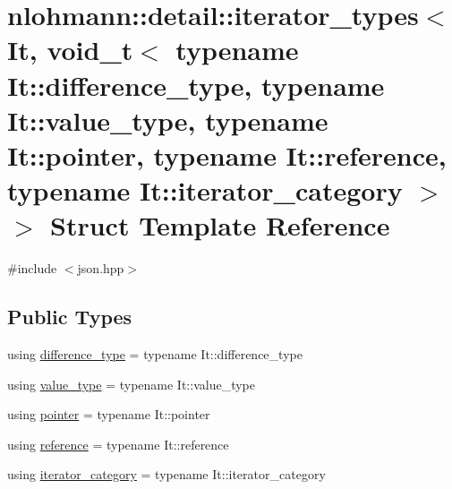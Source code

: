 \hypertarget{structnlohmann_1_1detail_1_1iterator__types_3_01_it_00_01void__t_3_01typename_01_it_1_1differenc4a413e9bd546446175f10f15c5631361}{}\section{nlohmann\+::detail\+::iterator\+\_\+types$<$ It, void\+\_\+t$<$ typename It\+::difference\+\_\+type, typename It\+::value\+\_\+type, typename It\+::pointer, typename It\+::reference, typename It\+::iterator\+\_\+category $>$ $>$ Struct Template Reference}
\label{structnlohmann_1_1detail_1_1iterator__types_3_01_it_00_01void__t_3_01typename_01_it_1_1differenc4a413e9bd546446175f10f15c5631361}


{\ttfamily \#include $<$json.\+hpp$>$}

\subsection*{Public Types}
\begin{DoxyCompactItemize}
\item 
using \mbox{\hyperlink{structnlohmann_1_1detail_1_1iterator__types_3_01_it_00_01void__t_3_01typename_01_it_1_1differenc4a413e9bd546446175f10f15c5631361_a1ce16c1c8c1d6a195f5a3d3ad31820f0}{difference\+\_\+type}} = typename It\+::difference\+\_\+type
\item 
using \mbox{\hyperlink{structnlohmann_1_1detail_1_1iterator__types_3_01_it_00_01void__t_3_01typename_01_it_1_1differenc4a413e9bd546446175f10f15c5631361_ac70fcab4cacd8b386c3f2b056885e15e}{value\+\_\+type}} = typename It\+::value\+\_\+type
\item 
using \mbox{\hyperlink{structnlohmann_1_1detail_1_1iterator__types_3_01_it_00_01void__t_3_01typename_01_it_1_1differenc4a413e9bd546446175f10f15c5631361_aacaf73dc959b7c2119c15e53b5ce00a3}{pointer}} = typename It\+::pointer
\item 
using \mbox{\hyperlink{structnlohmann_1_1detail_1_1iterator__types_3_01_it_00_01void__t_3_01typename_01_it_1_1differenc4a413e9bd546446175f10f15c5631361_a5e82d2d8dabd022b8ff916f2e83a82f2}{reference}} = typename It\+::reference
\item 
using \mbox{\hyperlink{structnlohmann_1_1detail_1_1iterator__types_3_01_it_00_01void__t_3_01typename_01_it_1_1differenc4a413e9bd546446175f10f15c5631361_aaaafbcd0573ec9cfc5d19411950dc1ac}{iterator\+\_\+category}} = typename It\+::iterator\+\_\+category
\end{DoxyCompactItemize}



